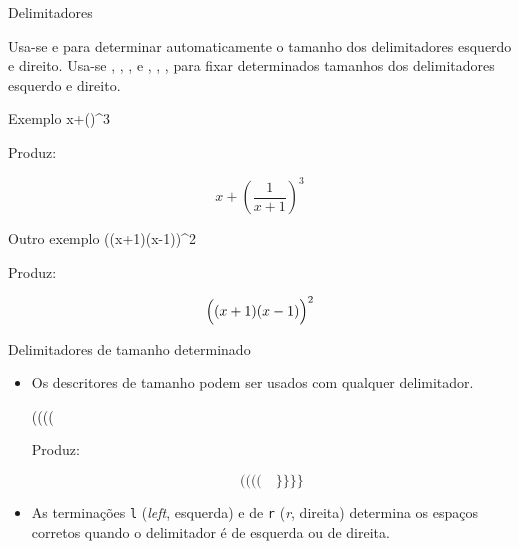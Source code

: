 \begin{frame}{Delimitadores}
	\fontsize{10}{11}\selectfont

	Usa-se  e  para determinar automaticamente o tamanho dos delimitadores esquerdo e direito. Usa-se , , ,  e , , ,  para fixar determinados tamanhos dos delimitadores esquerdo e direito.

    \pause
	\begin{Codigo}{Exemplo}
		x+()\string^3
	\end{Codigo}

    \pause
	Produz:
	
	\begin{Resultado}{}
		\[x+\left(\frac{1}{x+1}\right)^3\]
	\end{Resultado}

    \pause
	\begin{Codigo}{Outro exemplo}
		((x+1)(x-1))\string^2
	\end{Codigo}

    \pause
	Produz:

	\begin{Resultado}{}
		\[\Bigl((x+1)(x-1)\Bigr)^2\]
	\end{Resultado}
\end{frame}

\begin{frame}{Delimitadores de tamanho determinado}
	\begin{itemize}
		\item Os descritores de tamanho podem ser usados com qualquer delimitador.

            \pause
			\begin{Codigo}{}
				((((\n
				\null\qquad{}\LCmd{\}}\LCmd{\}}\LCmd{\}}\LCmd{Biggr}\LCmd{\}}
			\end{Codigo}
			
			\pause
			Produz:
			
			\begin{Resultado}{}
				\[\big(\Big(\bigg(\Bigg(\quad\big\}\Big\}\bigg\}\Bigg\}\]
			\end{Resultado}

        \pause
		\item As terminações  \texttt{l} (\emph{left}, esquerda) e de \texttt{r} (\emph{r}, direita) determina os espaços corretos quando o delimitador é de esquerda ou de direita.
	\end{itemize}
\end{frame}

